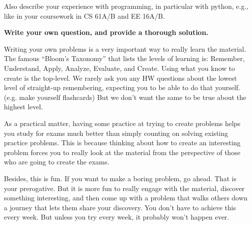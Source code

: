 \documentclass[preview]{standalone}
\begin{document}
Also describe your experience with programming, in particular with
python, e.g., like in your coursework in CS 61A/B and EE 16A/B.


{\bf Write your own question, and provide a thorough solution.}

Writing your own problems is a very important way to really learn
the material. The famous ``Bloom's Taxonomy'' that lists the levels of
learning is: Remember, Understand, Apply, Analyze, Evaluate, and
Create. Using what you know to create is the top-level. We rarely ask
you any HW questions about the lowest level of straight-up
remembering, expecting you to be able to do that yourself. (e.g. make
yourself flashcards) But we don't want the same to be true about the
highest level.

As a practical matter, having some practice at trying to create
problems helps you study for exams much better than simply counting on
solving existing practice problems. This is because thinking about how
to create an interesting problem forces you to really look at the
material from the perspective of those who are going to create the
exams. 

Besides, this is fun. If you want to make a boring problem, go
ahead. That is your prerogative. But it is more fun to really engage
with the material, discover something interesting, and then come up
with a problem that walks others down a journey that lets them share
your discovery. You don't have to achieve this every week. But unless
you try every week, it probably won't happen ever. 
\end{document}
